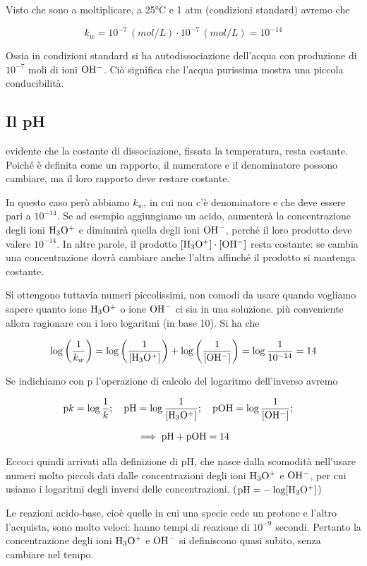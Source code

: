 Visto che sono a moltiplicare, a 25°C e 1 atm (condizioni standard) avremo che

$$k_w = 10^{-7} \, (mol/L) \cdot 10^{-7} \, (mol/L) = 10^{-14}$$

Ossia in condizioni standard si ha autodissociazione dell'acqua con produzione di $10^{-7}$ moli di ioni $\rm OH^-$. Ciò significa che l'acqua purissima mostra una piccola conducibilità.

\subsection{Il pH}
\E evidente che la costante di dissociazione, fissata la temperatura, resta costante. Poiché è definita come un rapporto, il numeratore e il denominatore possono cambiare, ma il loro rapporto deve restare costante.

In questo caso però abbiamo $k_w$, in cui non c'è denominatore e che deve essere pari a $10^{-14}$. Se ad esempio aggiungiamo un acido, aumenterà la concentrazione degli ioni $\rm H_3O^+$ e diminuirà quella degli ioni $\rm OH^-$, perché il loro prodotto deve valere $10^{-14}$. In altre parole, il prodotto $\rm [H_3O^+] \cdot [OH^-]$ resta costante: se cambia una concentrazione dovrà cambiare anche l'altra affinché il prodotto si mantenga costante.

Si ottengono tuttavia numeri piccolissimi, non comodi da usare quando vogliamo sapere quanto ione $\rm H_3O^+$ o ione $\rm OH^-$ ci sia in una soluzione. \E più conveniente allora ragionare con i loro logaritmi (in base 10). Si ha che

$$\log \left( \frac{1}{k_w} \right) = \log \left( \frac{1}{\rm{[H_3O^+]}} \right) + \log \left( \frac{1}{\rm{[OH^-]}} \right) = \log \frac{1}{10^{-14}}=14$$

Se indichiamo con p l'operazione di calcolo del logaritmo dell'inverso avremo

$$\text{p}k = \log \frac{1}{k}; \quad \rm pH = \log \frac{1}{[H_3O^+]}; \quad pOH = \log \frac{1}{[OH^-]}; \quad$$

$$\implies \rm pH + pOH = 14$$

Eccoci quindi arrivati alla definizione di pH, che nasce dalla scomodità nell'usare numeri molto piccoli dati dalle concentrazioni degli ioni $\rm H_3O^+$ e $\rm OH^-$, per cui usiamo i logaritmi degli inversi delle concentrazioni. ($\rm pH=-\log[H_3O^+]$)

Le reazioni acido-base, cioè quelle in cui una specie cede un protone e l'altro l'acquista, sono molto veloci: hanno tempi di reazione di $10^{-9}$ secondi. Pertanto la concentrazione degli ioni $\rm H_3O^+$ e $\rm OH^-$ si definiscono quasi subito, senza cambiare nel tempo.

